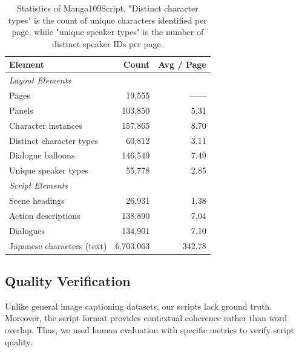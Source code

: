 \begin{table}[t]
\setlength{\abovecaptionskip}{2pt}
\caption{
Statistics of Manga109Script. "Distinct character types" is the count of unique characters identified per page, while "unique speaker types" is the number of distinct speaker IDs per page.
}
{\setlength{\tabcolsep}{5pt}
\centering
{
\begin{tabular}{l r r}
\toprule
\textbf{Element} & \textbf{Count} & \textbf{Avg / Page} \\
\midrule
\multicolumn{3}{l}{\textit{Layout Elements}} \\
\hspace{0.5em}Pages & 19,555 & \-------\\
\hspace{0.5em}Panels & 103,850 & 5.31 \\
\hspace{0.5em}Character instances & 157,865 & 8.70 \\
\hspace{0.5em}Distinct character types & 60,812 & 3.11 \\
\hspace{0.5em}Dialogue balloons & 146,549 & 7.49 \\
\hspace{0.5em}Unique speaker types & 55,778 & 2.85 \\
\midrule
\multicolumn{3}{l}{\textit{Script Elements}} \\
\hspace{0.5em}Scene headings & 26,931 & 1.38 \\
\hspace{0.5em}Action descriptions & 138,890 & 7.04 \\
\hspace{0.5em}Dialogues & 134,901 & 7.10 \\
\hspace{0.5em}Japanese characters (text) & 6,703,063 & 342.78 \\
\bottomrule
\end{tabular}
}}
\label{tab:statistics}
\vspace{-1.2em}
\end{table}

\subsection{Quality Verification}
Unlike general image captioning datasets, our scripts lack ground truth.
Moreover, the script format provides contextual coherence rather than word overlap.
Thus, we used human evaluation with specific metrics to verify script quality.

